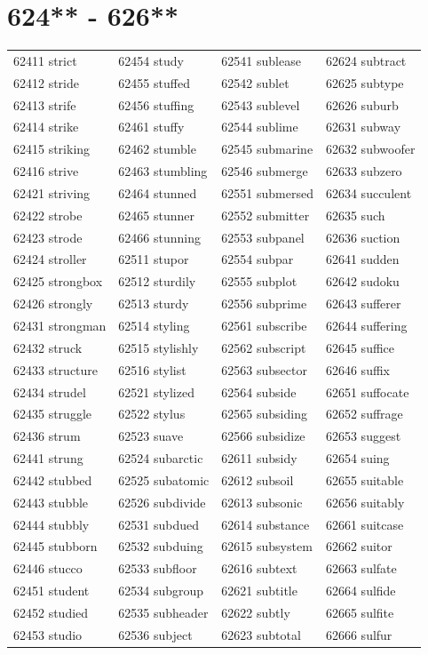 \documentclass[10pt, oneside]{book}
\begin{document}
\begin{table}
	\centering
	\section*{624** - 626**}
	\begin{tabular}{l l l l}
62411 strict &62454 study &62541 sublease &62624 subtract\\
62412 stride &62455 stuffed &62542 sublet &62625 subtype\\
62413 strife &62456 stuffing &62543 sublevel &62626 suburb\\
62414 strike &62461 stuffy &62544 sublime &62631 subway\\
62415 striking &62462 stumble &62545 submarine &62632 subwoofer\\
62416 strive &62463 stumbling &62546 submerge &62633 subzero\\
62421 striving &62464 stunned &62551 submersed &62634 succulent\\
62422 strobe &62465 stunner &62552 submitter &62635 such\\
62423 strode &62466 stunning &62553 subpanel &62636 suction\\
62424 stroller &62511 stupor &62554 subpar &62641 sudden\\
62425 strongbox &62512 sturdily &62555 subplot &62642 sudoku\\
62426 strongly &62513 sturdy &62556 subprime &62643 sufferer\\
62431 strongman &62514 styling &62561 subscribe &62644 suffering\\
62432 struck &62515 stylishly &62562 subscript &62645 suffice\\
62433 structure &62516 stylist &62563 subsector &62646 suffix\\
62434 strudel &62521 stylized &62564 subside &62651 suffocate\\
62435 struggle &62522 stylus &62565 subsiding &62652 suffrage\\
62436 strum &62523 suave &62566 subsidize &62653 suggest\\
62441 strung &62524 subarctic &62611 subsidy &62654 suing\\
62442 stubbed &62525 subatomic &62612 subsoil &62655 suitable\\
62443 stubble &62526 subdivide &62613 subsonic &62656 suitably\\
62444 stubbly &62531 subdued &62614 substance &62661 suitcase\\
62445 stubborn &62532 subduing &62615 subsystem &62662 suitor\\
62446 stucco &62533 subfloor &62616 subtext &62663 sulfate\\
62451 student &62534 subgroup &62621 subtitle &62664 sulfide\\
62452 studied &62535 subheader &62622 subtly &62665 sulfite\\
62453 studio &62536 subject &62623 subtotal &62666 sulfur\\
	\end{tabular}
 \end{table}
\clearpage
\end{document}
